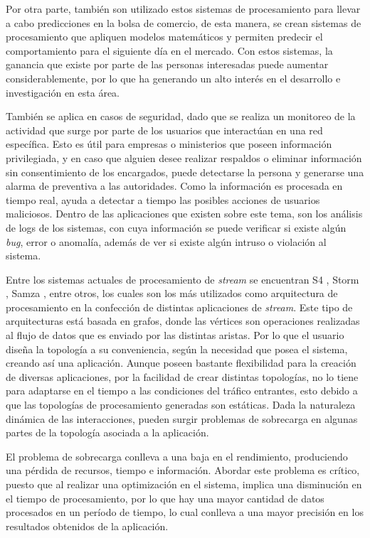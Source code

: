 Por otra parte, también son utilizado estos sistemas de procesamiento para llevar a cabo predicciones en la bolsa de comercio, de esta manera, se crean sistemas de procesamiento que apliquen modelos matemáticos y permiten predecir el comportamiento para el siguiente día en el mercado. Con estos sistemas, la ganancia que existe por parte de las personas interesadas puede aumentar considerablemente, por lo que ha generando un alto interés en el desarrollo e investigación en esta área.

También se aplica en casos de seguridad, dado que se realiza un monitoreo de la actividad que surge por parte de los usuarios que interactúan en una red específica. Esto es útil para empresas o ministerios que poseen información privilegiada, y en caso que alguien desee realizar respaldos o eliminar información sin consentimiento de los encargados, puede detectarse la persona y generarse una alarma de preventiva a las autoridades. Como la información es procesada en tiempo real, ayuda a detectar a tiempo las posibles acciones de usuarios maliciosos. Dentro de las aplicaciones que existen sobre este tema, son los análisis de logs de los sistemas, con cuya información se puede verificar si existe algún \textit{bug}, error o anomalía, además de ver si existe algún intruso o violación al sistema.

Entre los sistemas actuales de procesamiento de \textsl{stream} se encuentran S4 \citep{s4yahoo}, Storm \citep{stormtwitter}, Samza \citep{samza}, entre otros, los cuales son los más utilizados como arquitectura de procesamiento en la confección de distintas aplicaciones de \textsl{stream}. Este tipo de arquitecturas está basada en grafos, donde las vértices son operaciones realizadas al flujo de datos que es enviado por las distintas aristas. Por lo que el usuario diseña la topología a su conveniencia, según la necesidad que posea el sistema, creando así una aplicación. Aunque poseen bastante flexibilidad para la creación de diversas aplicaciones, por la facilidad de crear distintas topologías, no lo tiene para adaptarse en el tiempo a las condiciones del tráfico entrantes, esto debido a que las topolog\'ias de procesamiento generadas son est\'aticas. Dada la naturaleza din\'amica de las interacciones, pueden surgir problemas de sobrecarga en algunas partes de la topología asociada a la aplicación.

El problema de sobrecarga conlleva a una baja en el rendimiento, produciendo una pérdida de recursos, tiempo e información. Abordar este problema es crítico, puesto que al realizar una optimización en el sistema, implica una disminución en el tiempo de procesamiento, por lo que hay una mayor cantidad de datos procesados en un período de tiempo, lo cual conlleva a una mayor precisión en los resultados obtenidos de la aplicación.

